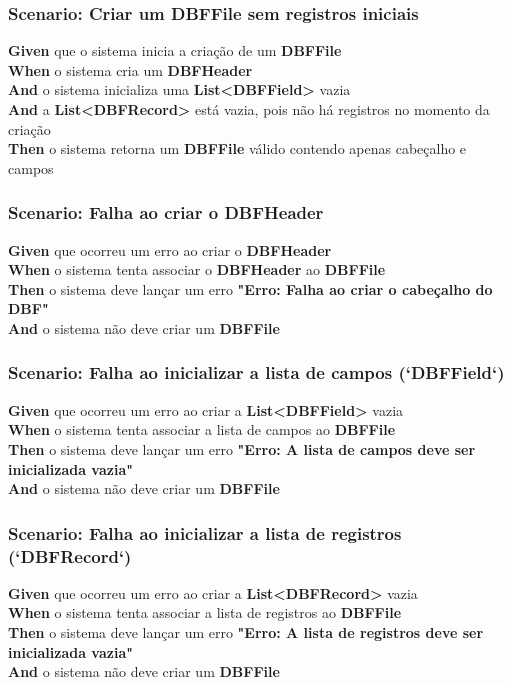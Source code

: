 \subsubsection{Scenario: Criar um DBFFile sem registros iniciais}
\textbf{Given} que o sistema inicia a criação de um \textbf{DBFFile} \\
\textbf{When} o sistema cria um \textbf{DBFHeader} \\
\textbf{And} o sistema inicializa uma \textbf{List<DBFField>} vazia \\
\textbf{And} a \textbf{List<DBFRecord>} está vazia, pois não há registros no momento da criação \\
\textbf{Then} o sistema retorna um \textbf{DBFFile} válido contendo apenas cabeçalho e campos \\

\subsubsection{Scenario: Falha ao criar o DBFHeader}
\textbf{Given} que ocorreu um erro ao criar o \textbf{DBFHeader} \\
\textbf{When} o sistema tenta associar o \textbf{DBFHeader} ao \textbf{DBFFile} \\
\textbf{Then} o sistema deve lançar um erro \textbf{"Erro: Falha ao criar o cabeçalho do DBF"} \\
\textbf{And} o sistema não deve criar um \textbf{DBFFile} \\

\subsubsection{Scenario: Falha ao inicializar a lista de campos (`DBFField`)}
\textbf{Given} que ocorreu um erro ao criar a \textbf{List<DBFField>} vazia \\
\textbf{When} o sistema tenta associar a lista de campos ao \textbf{DBFFile} \\
\textbf{Then} o sistema deve lançar um erro \textbf{"Erro: A lista de campos deve ser inicializada vazia"} \\
\textbf{And} o sistema não deve criar um \textbf{DBFFile} \\

\subsubsection{Scenario: Falha ao inicializar a lista de registros (`DBFRecord`)}
\textbf{Given} que ocorreu um erro ao criar a \textbf{List<DBFRecord>} vazia \\
\textbf{When} o sistema tenta associar a lista de registros ao \textbf{DBFFile} \\
\textbf{Then} o sistema deve lançar um erro \textbf{"Erro: A lista de registros deve ser inicializada vazia"} \\
\textbf{And} o sistema não deve criar um \textbf{DBFFile} \\

